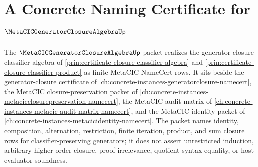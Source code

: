 \chapter{A Concrete Naming Certificate for $\MetaCICGeneratorClosureAlgebraUp$}
\label{ch:concrete-instances-metacic-generator-closure-algebra-namecert}

The $\MetaCICGeneratorClosureAlgebraUp$ packet realizes the generator-closure classifier algebra of \autoref{prin:certificate-closure-classifier-algebra} and \autoref{prin:certificate-closure-classifier-product} as finite MetaCIC NameCert rows. It sits beside the generator-closure certificate of \autoref{ch:concrete-instances-generatorclosure-namecert}, the MetaCIC closure-preservation packet of \autoref{ch:concrete-instances-metacicclosurepreservation-namecert}, the MetaCIC audit matrix of \autoref{ch:concrete-instances-metacic-audit-matrix-namecert}, and the MetaCIC identity packet of \autoref{ch:concrete-instances-metacicidentity-namecert}. The packet names identity, composition, alternation, restriction, finite iteration, product, and sum closure rows for classifier-preserving generators; it does not assert unrestricted induction, arbitrary higher-order closure, proof irrelevance, quotient syntax equality, or host evaluator soundness.

